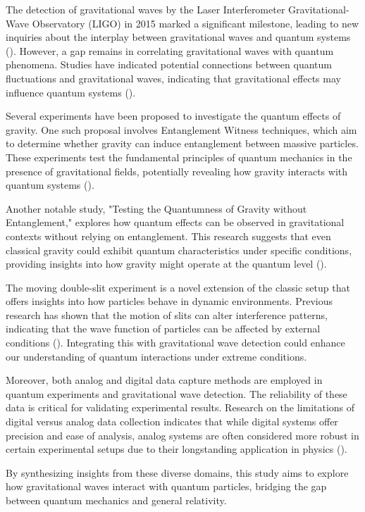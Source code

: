 \documentclass{article}
\begin{document}
The detection of gravitational waves by the Laser Interferometer Gravitational-Wave Observatory (LIGO) in 2015 marked a significant milestone, leading to new inquiries about the interplay between gravitational waves and quantum systems (\cite{abbott2016}). However, a gap remains in correlating gravitational waves with quantum phenomena. Studies have indicated potential connections between quantum fluctuations and gravitational waves, indicating that gravitational effects may influence quantum systems (\cite{maldacena2013}).

Several experiments have been proposed to investigate the quantum effects of gravity. One such proposal involves Entanglement Witness techniques, which aim to determine whether gravity can induce entanglement between massive particles. These experiments test the fundamental principles of quantum mechanics in the presence of gravitational fields, potentially revealing how gravity interacts with quantum systems (\cite{rangamani2017}).

Another notable study, "Testing the Quantumness of Gravity without Entanglement," explores how quantum effects can be observed in gravitational contexts without relying on entanglement. This research suggests that even classical gravity could exhibit quantum characteristics under specific conditions, providing insights into how gravity might operate at the quantum level (\cite{oppenheim2021}).

The moving double-slit experiment is a novel extension of the classic setup that offers insights into how particles behave in dynamic environments. Previous research has shown that the motion of slits can alter interference patterns, indicating that the wave function of particles can be affected by external conditions (\cite{scully1999}). Integrating this with gravitational wave detection could enhance our understanding of quantum interactions under extreme conditions.

Moreover, both analog and digital data capture methods are employed in quantum experiments and gravitational wave detection. The reliability of these data is critical for validating experimental results. Research on the limitations of digital versus analog data collection indicates that while digital systems offer precision and ease of analysis, analog systems are often considered more robust in certain experimental setups due to their longstanding application in physics (\cite{klyshko1988}).

By synthesizing insights from these diverse domains, this study aims to explore how gravitational waves interact with quantum particles, bridging the gap between quantum mechanics and general relativity.
\end{document}
